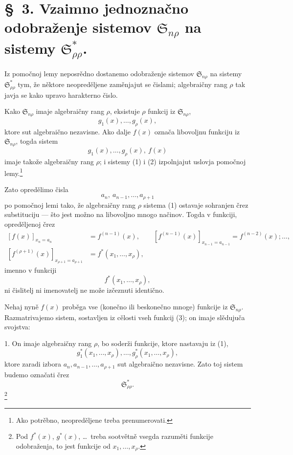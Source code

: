 \documentclass[11pt]{article}
\providecommand{\Ssys}{\mathfrak{S}}
\begin{document}
\section*{\S\ 3. Vzaimno jednoznačno odobraženje sistemov $\Ssys_{n\rho}$ na sistemy $\Ssys^*_{\rho\rho}$.}

Iz pomočnoj lemy neposrědno dostanemo odobraženje sistemov $\Ssys_{n\rho}$ na sistemy $\Ssys^*_{\rho\rho}$ tym, že něktore neopreděljene zaměnjajut se čislami; algebraičny rang $\rho$ tak javja se kako upravo harakterno čislo.

Kako $\Ssys_{n\rho}$ imaje algebraičny rang $\rho$, eksistuje $\rho$ funkcij iz $\Ssys_{n\rho}$,
\begin{equation}
  g_1(x),\ldots,g_\rho(x),
\tag{1}
\end{equation}
ktore sut algebraično nezavisne. Ako dalje $f(x)$ označa libovoljnu funkciju iz $\Ssys_{n\rho}$, togda sistem
\begin{equation}
  g_1(x),\ldots,g_\rho(x),\ f(x)
\tag{2}
\end{equation}
imaje takože algebraičny rang $\rho$; i sistemy (1) i (2) izpolnjajut uslovja pomočnoj lemy.\footnote{Ako potrěbno, neopreděljene treba prenumerovati.}

Zato opredělimo čisla
\[
  a_n,\ a_{n-1},\ldots,a_{\rho+1}
\]
po pomočnoj lemi tako, že algebraičny rang $\rho$ sistema (1) ostavaje sohranjen črez substituciju --- što jest možno na libovoljno mnogo načinov. Togda v funkciji, opreděljenoj črez
\[
\begin{aligned}
 [f(x)]_{x_n=a_n}&=f^{(n-1)}(x),\qquad
 [f^{(n-1)}(x)]_{x_{n-1}=a_{n-1}}=f^{(n-2)}(x);\ldots,\\
 [f^{(\rho+1)}(x)]_{x_{\rho+1}=a_{\rho+1}}&=f^*(x_1,
\ldots,x_\rho),
\end{aligned}
\]
imenno v funkciji
\begin{equation}
  f^*(x_1,\ldots,x_\rho),
\tag{3}
\end{equation}
ni čislitelj ni imenovatelj ne može izčeznuti identično.

Nehaj nyně $f(x)$ proběga vse (konečno ili beskonečno mnoge) funkcije iz $\Ssys_{n\rho}$. Razmatrivajemo sistem, sostavljen iz cělosti vseh funkcij (3); on imaje slědujuča svojstva:

1. On imaje algebraičny rang $\rho$, bo soderži funkcije, ktore nastavaju iz (1),
\[
  g_1^*(x_1,
\ldots,x_\rho),\ldots,g_\rho^*(x_1,\ldots,x_\rho),
\]
ktore zaradi izbora $a_n,a_{n-1},\ldots,a_{\rho+1}$ sut algebraično nezavisne. Zato toj sistem budemo označati črez
\[
  \Ssys^*_{\rho\rho}.
\]
\footnote{Pod $f^*(x)$, $g^*(x)$, \ldots\ treba sootvětně vsegda razuměti funkcije odobraženja, to jest funkcije od $x_1,\ldots,x_\rho$.}
\end{document}
